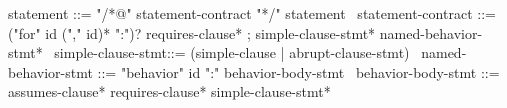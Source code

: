 \begin{syntax}
  statement ::= "/*@" statement-contract "*/" statement
  \
  statement-contract ::= {("for" id ("," id)* ":")?} requires-clause* ;
    simple-clause-stmt* named-behavior-stmt*
  \
  simple-clause-stmt::= (simple-clause | abrupt-clause-stmt)
  \
  named-behavior-stmt ::= "behavior" id ":" behavior-body-stmt
  \
  behavior-body-stmt ::= assumes-clause* requires-clause* simple-clause-stmt*
\end{syntax}
